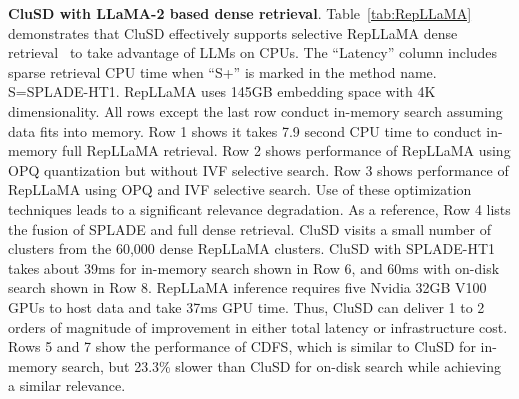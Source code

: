 {\bf CluSD with LLaMA-2 based dense retrieval}.
Table~\ref{tab:RepLLaMA}
demonstrates that CluSD effectively supports selective RepLLaMA dense retrieval~\cite{ma2023finetuning} 
to take  advantage of   LLMs on CPUs. 
The ``Latency'' column includes sparse retrieval CPU time when ``S+'' is marked in the method name. 
S=SPLADE-HT1.
RepLLaMA  uses 145GB embedding space with 4K dimensionality.
All rows except the last row  conduct in-memory search assuming data fits into memory.
Row 1 shows  it takes 7.9 second CPU time to conduct in-memory full RepLLaMA  retrieval. 
Row 2  shows performance of RepLLaMA using OPQ quantization but without IVF selective search.
Row 3  shows performance of RepLLaMA using OPQ and  IVF selective search.
Use  of these optimization techniques leads to  a significant relevance degradation. 
As a reference, Row 4 lists the fusion of SPLADE and  full dense retrieval. 
CluSD visits  a small number of clusters from the 60,000 dense RepLLaMA clusters. 
CluSD  with SPLADE-HT1 takes about 39ms for in-memory search shown in  
Row 6, and  60ms with on-disk search shown in Row 8.  
RepLLaMA inference requires five Nvidia 32GB V100 GPUs  to host data and take 37ms GPU time. 
Thus, CluSD  can deliver 1 to 2 orders of magnitude of improvement in either total latency or infrastructure cost.
Rows 5 and 7 show the performance of CDFS, which is similar to CluSD for in-memory search, but 23.3\%
slower than  CluSD for on-disk search while achieving a similar relevance.






